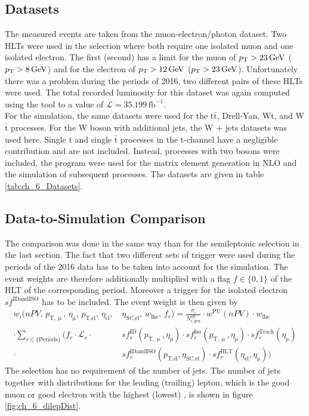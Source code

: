 \subsection{Datasets}
The measured events are taken from the muon-electron/photon dataset. Two HLTs were used in the selection where both require one isolated muon and one isolated electron. The first (second) has a limit for the muon of $p_\mathrm{T} > 23\,\mathrm{GeV}$ ($p_\mathrm{T} > 8\,\mathrm{GeV}$) and for the electron of $p_\mathrm{T} > 12\,\mathrm{GeV}$ ($p_\mathrm{T} > 23\,\mathrm{GeV}$). Unfortunately there was a problem during the periods of 2016, two different pairs of these HLTs were used. The total recorded luminosity for this dataset was again computed using the \brilcalc tool to a value of $\mathcal{L} = 35.199\,\textrm{fb}^{-1}$.\\

For the simulation, the same datasets were used for the t$\bar{\textrm{t}}$, Drell-Yan, Wt, and W$\bar{\textrm{t}}$ processes. For the W boson with additional jets, the W + jets datasets was used here. Single t and single $\bar{\textrm{t}}$ processes in the t-channel have a negligible contribution and are not included. Instead, processes with two bosons were included, the  program were used for the matrix element generation in NLO and the simulation of subsequent processes. The datasets are given in table \ref{tab:ch_6_Datasets}. 

\subsection{Data-to-Simulation Comparison}
The comparison was done in the same way than for the semileptonic selection in the last section. The fact that two different sets of trigger were used during the periods of the 2016 data has to be taken into account for the simulation. The event weights are therefore additionally multiplied with a flag $f \in \{0,1\}$ of the HLT of the corresponding period. Moreover a trigger for the isolated electron $sf^\textrm{IDandISO}$ has to be included. The event weight is then given by
\begin{equation}
\begin{split}
w_i(nPV,\, p_{\textrm{T},\upmu},\, \eta_\upmu,\, p_\textrm{T,el},\, \eta_\textrm{el},\, &\eta_\textrm{SC,el},\, w_\textrm{lhe},\, f_r) = \frac{\sigma_i}{N_{i,\textrm{gen}}^\textrm{eff}} \cdot w^\textrm{PU}(nPV) \cdot w_\textrm{lhe}\\
 \cdot \sum_{r \in \{\textrm{Periods}\}} \biggl( f_r  \cdot \mathcal{L}_r \cdot &sf^\textrm{ID}_r(p_{\textrm{T},\upmu},\eta_\upmu) \cdot sf^\textrm{Iso}_r(p_{\textrm{T},\upmu},\eta_\upmu) \cdot sf^\textrm{Track}_r(\eta_\upmu)  \\
  \cdot &sf^\textrm{IDandISO}_r(p_\textrm{T,el},\eta_\textrm{SC,el}) \cdot sf^\textrm{HLT}_r(\eta_\textrm{el},\eta_\upmu) \biggr)
\end{split}
\end{equation}
The selection has no requirement of the number of jets. The number of jets together with distributions for the leading (trailing) lepton, which is the good muon or good electron with the highest (lowest) {\pt}, is shown in figure \ref{fig:ch_6_dilepDist}. 




